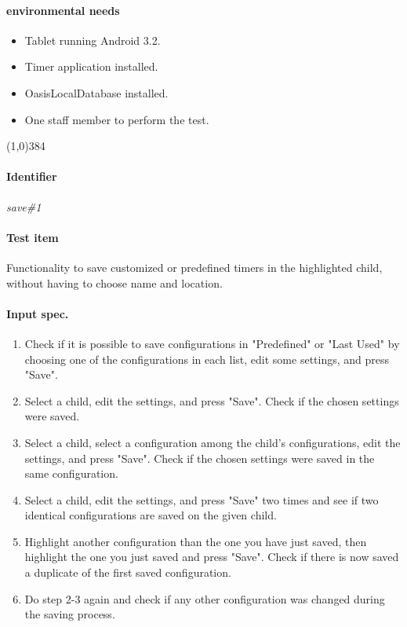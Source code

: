 \paragraph{environmental needs}
	\begin{itemize}
		\item Tablet running Android 3.2.
		\item Timer application installed.
		\item OasisLocalDatabase installed.
		\item One staff member to perform the test.
	\end{itemize}
\begin{center}
	\line(1,0){384}
\end{center}

\paragraph{Identifier}
	\textit{save\#1}
\paragraph{Test item}
	Functionality to save customized or predefined timers in the highlighted child, without having to choose name and location.
\paragraph{Input spec.}
	\begin{enumerate}
		\item Check if it is possible to save configurations in "Predefined" or "Last Used" by choosing one of the configurations in each list, edit some settings, and press "Save".
		\item Select a child, edit the settings, and press "Save". Check if the chosen settings were saved.
		\item Select a child, select a configuration among the child's configurations, edit the settings, and press "Save". Check if the chosen settings were saved in the same configuration.
		\item Select a child, edit the settings, and press "Save" two times and see if two identical configurations are saved on the given child.
		\item Highlight another configuration than the one you have just saved, then highlight the one you just saved and press "Save". Check if there is now saved a duplicate of the first saved configuration.
		\item Do step 2-3 again and check if any other configuration was changed during the saving process.
	\end{enumerate}

